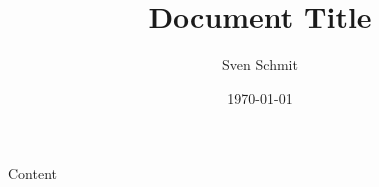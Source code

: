 \title{Document Title}
\author{Sven Schmit}
\date{\today}



    \maketitle

    Content

    
    


